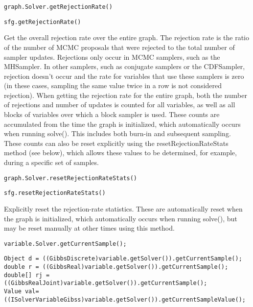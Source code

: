 \ifmatlab
\begin{lstlisting}
graph.Solver.getRejectionRate()
\end{lstlisting}
\fi

\ifjava
\begin{lstlisting}
sfg.getRejectionRate()
\end{lstlisting}
\fi

Get the overall rejection rate over the entire graph.  The rejection rate is the ratio of the number of MCMC proposals that were rejected to the total number of sampler updates.  Rejections only occur in MCMC samplers, such as the MHSampler.  In other samplers, such as conjugate samplers or the CDFSampler, rejection doesn't occur and the rate for variables that use these samplers is zero (in these cases, sampling the same value twice in a row is not considered rejection).  When getting the rejection rate for the entire graph, both the number of rejections and number of updates is counted for all variables, as well as all blocks of variables over which a block sampler is used.  These counts are accumulated from the time the graph is initialized, which automatically occurs when running solve().  This includes both burn-in and subsequent sampling.  These counts can also be reset explicitly using the resetRejectionRateStats method (see below), which allows these values to be determined, for example, during a specific set of samples.

\ifmatlab
\begin{lstlisting}
graph.Solver.resetRejectionRateStats()
\end{lstlisting}
\fi

\ifjava
\begin{lstlisting}
sfg.resetRejectionRateStats()
\end{lstlisting}
\fi

Explicitly reset the rejection-rate statistics.  These are automatically reset when the graph is initialized, which automatically occurs when running solve(), but may be reset manually at other times using this method.



\ifmatlab
\begin{lstlisting}
variable.Solver.getCurrentSample();
\end{lstlisting}
\fi

\ifjava
\begin{lstlisting}
Object d = ((GibbsDiscrete)variable.getSolver()).getCurrentSample();
double r = ((GibbsReal)variable.getSolver()).getCurrentSample();
double[] rj = ((GibbsRealJoint)variable.getSolver()).getCurrentSample();
Value val= ((ISolverVariableGibss)variable.getSolver()).getCurrentSampleValue();
\end{lstlisting}
\fi

